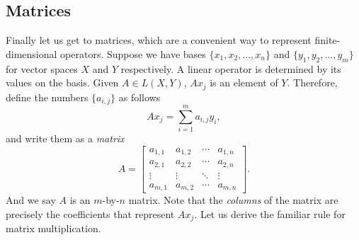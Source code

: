 \documentclass[12pt]{book}
\newcommand{\myindex}[1]{#1\index{#1}}
\theoremstyle{plain}
\theoremstyle{remark}
\theoremstyle{definition}
\theoremstyle{exercise}
\theoremstyle{example}
\begin{document}

\subsection{Matrices}

Finally let us get to matrices, which are a convenient way to represent
finite-dimensional operators.
Suppose we have bases $\{ x_1, x_2, \ldots, x_n \}$ and $\{ y_1, y_2, \ldots, y_m \}$
for vector spaces $X$ and $Y$ respectively.  A linear operator is 
determined by its values on the basis.  Given $A \in L(X,Y)$,
$A x_j$ is an element of $Y$.  Therefore,
define the numbers
$\{ a_{i,j} \}$ as follows
\begin{equation*}
A x_j = \sum_{i=1}^m a_{i,j} y_i ,
\end{equation*}
and write them as a \emph{\myindex{matrix}}
\begin{equation*}
A =
\begin{bmatrix}
a_{1,1} & a_{1,2} & \cdots & a_{1,n} \\
a_{2,1} & a_{2,2} & \cdots & a_{2,n} \\
\vdots & \vdots & \ddots & \vdots \\
a_{m,1} & a_{m,2} & \cdots & a_{m,n}
\end{bmatrix} .
\end{equation*}
And we say $A$ is an $m$-by-$n$ matrix.
Note that the \emph{\myindex{columns}} of the matrix are precisely the coefficients
that represent $A x_j$.
Let us derive the familiar rule for matrix multiplication.
\end{document}
